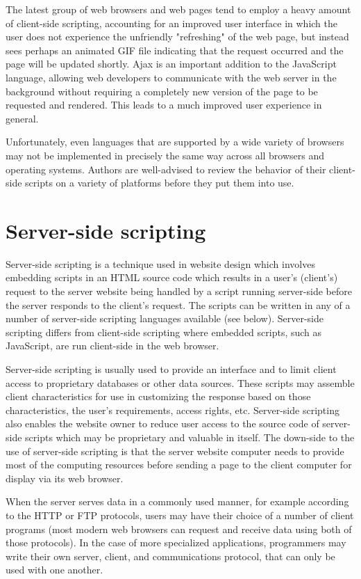 The latest group of web browsers and web pages tend to employ a heavy amount of client-side scripting, accounting for an improved user interface in which the user does not experience the unfriendly "refreshing" of the web page, but instead sees perhaps an animated GIF file indicating that the request occurred and the page will be updated shortly. Ajax is an important addition to the JavaScript language, allowing web developers to communicate with the web server in the background without requiring a completely new version of the page to be requested and rendered. This leads to a much improved user experience in general.

Unfortunately, even languages that are supported by a wide variety of browsers may not be implemented in precisely the same way across all browsers and operating systems. Authors are well-advised to review the behavior of their client-side scripts on a variety of platforms before they put them into use.


\section{Server-side scripting}

Server-side scripting\cite{sever_side_scripting} is a technique used in website design which involves embedding scripts in an HTML source code which results in a user's (client's) request to the server website being handled by a script running server-side before the server responds to the client's request. The scripts can be written in any of a number of server-side scripting languages available (see below). Server-side scripting differs from client-side scripting where embedded scripts, such as JavaScript, are run client-side in the web browser.

Server-side scripting is usually used to provide an interface and to limit client access to proprietary databases or other data sources. These scripts may assemble client characteristics for use in customizing the response based on those characteristics, the user's requirements, access rights, etc. Server-side scripting also enables the website owner to reduce user access to the source code of server-side scripts which may be proprietary and valuable in itself. The down-side to the use of server-side scripting is that the server website computer needs to provide most of the computing resources before sending a page to the client computer for display via its web browser.

When the server serves data in a commonly used manner, for example according to the HTTP or FTP protocols, users may have their choice of a number of client programs (most modern web browsers can request and receive data using both of those protocols). In the case of more specialized applications, programmers may write their own server, client, and communications protocol, that can only be used with one another.

